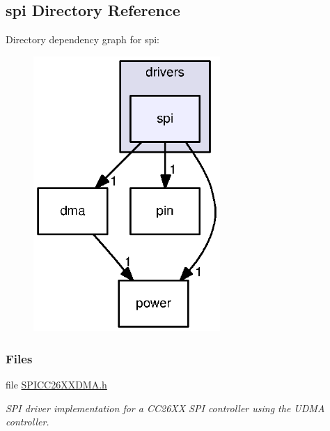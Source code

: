 \subsection{spi Directory Reference}
\label{dir_a818d007c92bded37f068153f738ea5d}
Directory dependency graph for spi\+:
\nopagebreak
\begin{figure}[H]
\begin{center}
\leavevmode
\includegraphics[width=201pt]{dir_a818d007c92bded37f068153f738ea5d_dep}
\end{center}
\end{figure}
\subsubsection*{Files}
\begin{DoxyCompactItemize}
\item 
file \hyperlink{_s_p_i_c_c26_x_x_d_m_a_8h}{S\+P\+I\+C\+C26\+X\+X\+D\+M\+A.\+h}
\begin{DoxyCompactList}\small\item\em S\+P\+I driver implementation for a C\+C26\+X\+X S\+P\+I controller using the U\+D\+M\+A controller. \end{DoxyCompactList}\end{DoxyCompactItemize}
